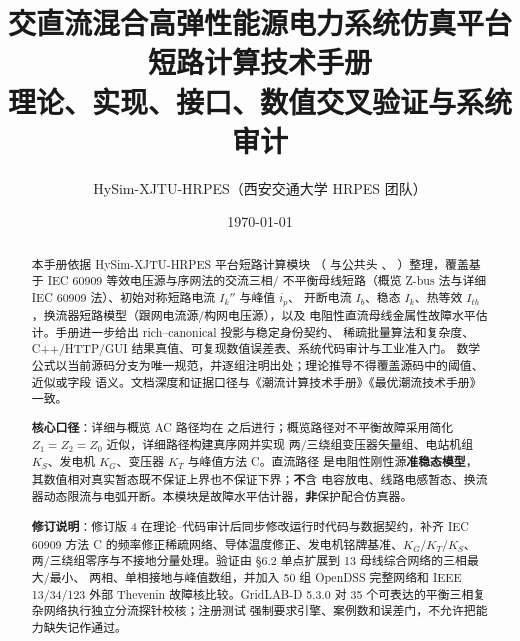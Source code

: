 \documentclass[UTF8,fontset=fandol,a4paper,11pt]{ctexart}
\title{\textbf{交直流混合高弹性能源电力系统仿真平台}\\[0.5em]
       {\Large 短路计算技术手册}\\[0.3em]
       {\large 理论、实现、接口、数值交叉验证与系统审计}}
\author{HySim-XJTU-HRPES（西安交通大学 HRPES 团队）}
\date{\today}
\begin{document}
\maketitle
\begin{abstract}
\noindent 本手册依据 HySim-XJTU-HRPES 平台短路计算模块
（ 与公共头 、
）整理，覆盖基于 IEC 60909 等效电压源与序网法的交流三相/
不平衡母线短路（概览 Z-bus 法与详细 IEC 60909 法）、初始对称短路电流 $I_k''$ 与峰值 $i_p$、
开断电流 $I_b$、稳态 $I_k$、热等效 $I_{th}$，换流器短路模型（跟网电流源/构网电压源），以及
电阻性直流母线金属性故障水平估计。手册进一步给出 rich--canonical 投影与稳定身份契约、
稀疏批量算法和复杂度、C++/HTTP/GUI 结果真值、可复现数值误差表、系统代码审计与工业准入门。
数学公式以当前源码分支为唯一规范，并逐组注明出处；理论推导不得覆盖源码中的阈值、近似或字段
语义。文档深度和证据口径与《潮流计算技术手册》《最优潮流技术手册》一致。

\smallskip
\noindent\textbf{核心口径}：详细与概览 AC 路径均在 
之后进行；概览路径对不平衡故障采用简化 $Z_1{=}Z_2{=}Z_0$ 近似，详细路径构建真序网并实现
两/三绕组变压器矢量组、电站机组 $K_S$、发电机 $K_G$、变压器 $K_T$ 与峰值方法 C。直流路径
是电阻性刚性源\textbf{准稳态模型}，其数值相对真实暂态既不保证上界也不保证下界；\textbf{不}含
电容放电、线路电感暂态、换流器动态限流与电弧开断。本模块是故障水平估计器，\textbf{非}保护配合仿真器。

\smallskip
\noindent\textbf{修订说明}：修订版 4 在理论--代码审计后同步修改运行时代码与数据契约，补齐
IEC 60909 方法 C 的频率修正稀疏网络、导体温度修正、发电机铭牌基准、$K_G/K_T/K_S$、
两/三绕组零序与不接地分量处理。验证由 §6.2 单点扩展到 13 母线综合网络的三相最大/最小、
两相、单相接地与峰值数组，并加入 50 组 OpenDSS 完整网络和 IEEE 13/34/123 外部 Thevenin
故障核比较。GridLAB-D 5.3.0 对 35 个可表达的平衡三相复杂网络执行独立分流探针校核；注册测试
强制要求引擎、案例数和误差门，不允许把能力缺失记作通过。
\end{abstract}

\tableofcontents
\newpage


















\end{document}
